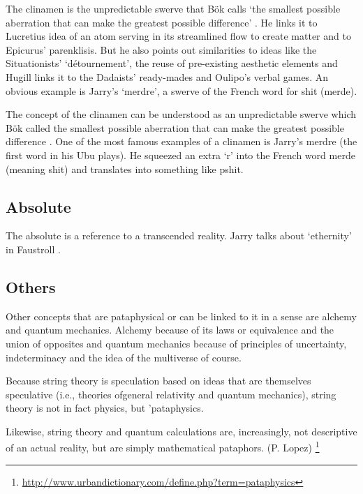 The clinamen is the unpredictable swerve that Bök calls `the smallest possible aberration that can make the greatest possible difference' \autocite[p.43]{Boek2002}. He links it to Lucretius idea of an atom serving in its streamlined flow to create matter and to Epicurus' parenklisis. But he also points out similarities to ideas like the Situationists' `détournement', the reuse of pre-existing aesthetic elements and Hugill links it to the Dadaists' ready-mades and Oulipo's verbal games. An obvious example is Jarry's `merdre', a swerve of the French word for shit (merde).

The concept of the clinamen can be understood as an unpredictable swerve which Bök called the smallest possible aberration that can make the greatest possible difference \autocite{Boek2002}. One of the most famous examples of a clinamen is Jarry's merdre (the first word in his Ubu plays). He squeezed an extra `r' into the French word merde (meaning shit) and translates into something like pshit.


\subsection{Absolute}

The absolute is a reference to a transcended reality. Jarry talks about `ethernity' in Faustroll \autocite[p.104]{Jarry1996}.


\subsection*{Others}

Other concepts that are pataphysical or can be linked to it in a sense are alchemy and quantum mechanics. Alchemy because of its laws or equivalence and the union of opposites \autocite{Hugill2012a} and quantum mechanics because of principles of uncertainty, indeterminacy and the idea of the multiverse of course.

\begin{fcom}
  Because string theory is speculation based on ideas that are themselves speculative (i.e., theories ofgeneral relativity and quantum mechanics), string theory is not in fact physics, but 'pataphysics.
\end{fcom}

\begin{fcom}
  Likewise, string theory and quantum calculations are, increasingly, not descriptive of an actual reality, but are simply mathematical pataphors. (P. Lopez) \footnote{\url{http://www.urbandictionary.com/define.php?term=pataphysics}}
\end{fcom}


